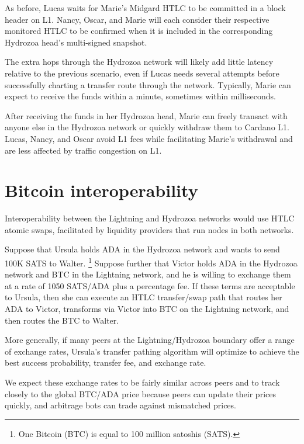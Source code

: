 \documentclass[11pt,a4paper,oneside]{article}
\begin{document}
\begin{multicols}{2}
As before, Lucas waits for Marie's Midgard HTLC to be committed in a block header on L1.
Nancy, Oscar, and Marie will each consider their respective monitored HTLC to be confirmed when it is included in the corresponding Hydrozoa head's multi-signed snapshot.

The extra hops through the Hydrozoa network will likely add little latency relative to the previous scenario, even if Lucas needs several attempts before successfully charting a transfer route through the network.
Typically, Marie can expect to receive the funds within a minute, sometimes within milliseconds.

After receiving the funds in her Hydrozoa head, Marie can freely transact with anyone else in the Hydrozoa network or quickly withdraw them to Cardano L1.
Lucas, Nancy, and Oscar avoid L1 fees while facilitating Marie's withdrawal and are less affected by traffic congestion on L1.

\section{Bitcoin interoperability}%
\label{h:bitcoin-interoperability}

Interoperability between the Lightning and Hydrozoa networks would use HTLC atomic swaps, facilitated by liquidity providers that run nodes in both networks.

Suppose that Ursula holds ADA in the Hydrozoa network and wants to send 100K SATS to Walter.%
\footnote{One Bitcoin (BTC) is equal to 100 million satoshis (SATS).}
Suppose further that Victor holds ADA in the Hydrozoa network and BTC in the Lightning network, and he is willing to exchange them at a rate of 1050 SATS/ADA plus a percentage fee.
If these terms are acceptable to Ursula, then she can execute an HTLC transfer/swap path that routes her ADA to Victor, transforms via Victor into BTC on the Lightning network, and then routes the BTC to Walter.

More generally, if many peers at the Lightning/Hydrozoa boundary offer a range of exchange rates, Ursula's transfer pathing algorithm will optimize to achieve the best success probability, transfer fee, and exchange rate.

We expect these exchange rates to be fairly similar across peers and to track closely to the global BTC/ADA price because peers can update their prices quickly, and arbitrage bots can trade against mismatched prices.


\end{multicols}
\end{document}
